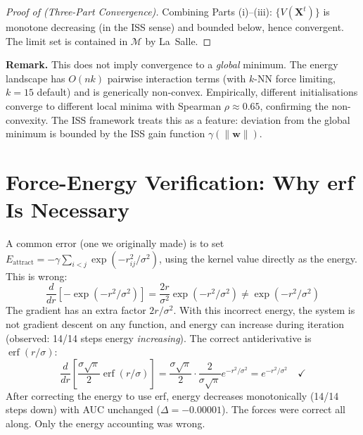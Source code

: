 \documentclass{article}
\DeclareMathOperator{\erf}{erf}
\begin{document}
\begin{proof}[Proof of  (Three-Part Convergence)]
Combining Parts (i)--(iii): $\{V(\mathbf{X}^t)\}$ is monotone decreasing (in the ISS sense) and bounded below, hence convergent. The limit set is contained in $\mathcal{M}$ by La~Salle.
\end{proof}

\textbf{Remark.} This does not imply convergence to a \emph{global} minimum. The energy landscape has $O(nk)$ pairwise interaction terms (with $k$-NN force limiting, $k{=}15$ default) and is generically non-convex. Empirically, different initialisations converge to different local minima with Spearman $\rho \approx 0.65$, confirming the non-convexity. The ISS framework treats this as a feature: deviation from the global minimum is bounded by the ISS gain function $\gamma(\|\mathbf{w}\|)$.

\section{Force-Energy Verification: Why erf Is Necessary}
\label{app:erf}

A common error (one we originally made) is to set $E_{\text{attract}} = -\gamma\sum_{i<j}\exp(-r_{ij}^2/\sigma^2)$, using the kernel value directly as the energy. This is wrong:
\begin{equation}
\frac{d}{dr}\left[-\exp(-r^2/\sigma^2)\right] = \frac{2r}{\sigma^2}\exp(-r^2/\sigma^2) \neq \exp(-r^2/\sigma^2)
\end{equation}
The gradient has an extra factor $2r/\sigma^2$. With this incorrect energy, the system is not gradient descent on any function, and energy can increase during iteration (observed: 14/14 steps energy \emph{increasing}). The correct antiderivative is $\erf(r/\sigma)$:
\begin{equation}
\frac{d}{dr}\left[\frac{\sigma\sqrt{\pi}}{2}\erf(r/\sigma)\right] = \frac{\sigma\sqrt{\pi}}{2} \cdot \frac{2}{\sigma\sqrt{\pi}}e^{-r^2/\sigma^2} = e^{-r^2/\sigma^2} \quad \checkmark
\end{equation}
After correcting the energy to use erf, energy decreases monotonically (14/14 steps down) with AUC unchanged ($\Delta = -0.00001$). The forces were correct all along. Only the energy accounting was wrong.
\end{document}
